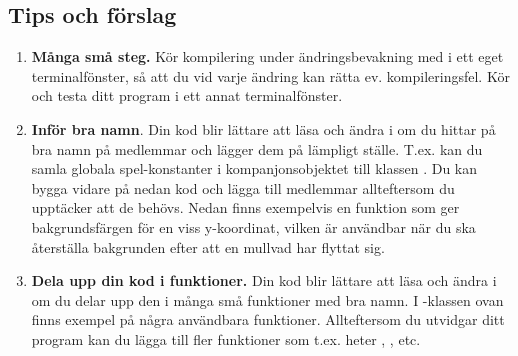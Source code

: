 \subsection{Tips och förslag}

\begin{enumerate}[leftmargin=*]
  \item \textbf{Många små steg.} Kör kompilering under ändringsbevakning med  i ett eget terminalfönster, så att du vid varje ändring kan rätta ev. kompileringsfel. Kör och testa ditt program i ett annat terminalfönster.

  \item \textbf{Inför bra namn}. Din kod blir lättare att läsa och ändra i om du hittar på bra namn på medlemmar och lägger dem på lämpligt ställe. T.ex. kan du samla globala spel-konstanter i kompanjonsobjektet till klassen . Du kan bygga vidare på nedan kod och lägga till medlemmar allteftersom du upptäcker att de behövs. Nedan finns exempelvis en funktion som ger bakgrundsfärgen för en viss y-koordinat, vilken är användbar när du ska återställa bakgrunden efter att en mullvad har flyttat sig.
%
%
%
%
%
%
%

 \item \textbf{Dela upp din kod i funktioner.} Din kod blir lättare att läsa och ändra i om du delar upp den i många små funktioner med bra namn. I -klassen ovan finns exempel på några användbara funktioner. Allteftersom du utvidgar ditt program kan du lägga till fler funktioner som t.ex. heter , , etc.


\end{enumerate}
